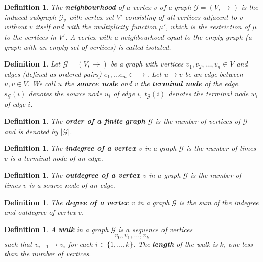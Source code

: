 \documentclass[a4paper,11pt]{report}
\newtheorem{definition}[theorem]{Definition}
\newcommand{\graf}{\mathscr{G}}
\begin{document}
 \begin{definition}
  The \textbf{neighbourhood} of a vertex $v$ of a graph $\graf=(V,\to)$ is the induced subgraph $\graf_v$ 
 with vertex set $V'$ consisting of all vertices adjacent to $v$ without $v$ itself and with the multiplicity function $\mu'$,
 which is the restriction of $\mu$ to the vertices in $V'$.
 A vertex with a neighbourhood equal to the empty graph (a graph with an empty set of vertices) is called 
 \emph{isolated}.
\end{definition}  
  

 \begin{definition}\label{terminal}
  Let $\graf=(V,\to)$ be a graph with vertices $v_1, v_2, \ldots, v_n \in V$ 
  and edges (defined as ordered pairs) $e_1, \ldots e_m  \in \to$. Let $u \to v$ be an edge between $u, v \in V$. 
  We call $u$ the \textbf{source node} and $v$ the \textbf{terminal node} of the 
  edge. $s_\graf(i)$ denotes the source node $u_i$ of edge $i$, $t_\graf(i)$ denotes the 
  terminal node $w_i$ of edge $i$.
\end{definition}
 
\begin{definition}
  The \textbf{order of a finite graph $\graf$} is the number of vertices of $\graf$ and is denoted by $|\graf|$.  
\end{definition} 
  
  \begin{definition}
    The \textbf{indegree of a vertex $v$} in a graph $\graf$ is the number of times $v$ is a terminal node of an edge. 
    
  \end{definition}
    \begin{definition}
    The \textbf{outdegree of a vertex $v$} in a graph $\graf$ is the number of times $v$ is a source node of an edge. 
    
  \end{definition}
      \begin{definition}
    The \textbf{degree of a vertex $v$} in a graph $\graf$ is the sum of the indegree and outdegree of vertex $v$. 
    
  \end{definition}
  
  
 
 \begin{definition}
   A  \textbf{walk} in a graph $\graf$ is a sequence of vertices
   $$v_0,v_1,\ldots,v_k$$
   such that $v_{i-1} \to v_i$ for each $i \in \{1,\ldots,k\}$. The \textbf{length} of the walk is $k$, one less
   than the number of vertices. 
 \end{definition}
 
\end{document}
